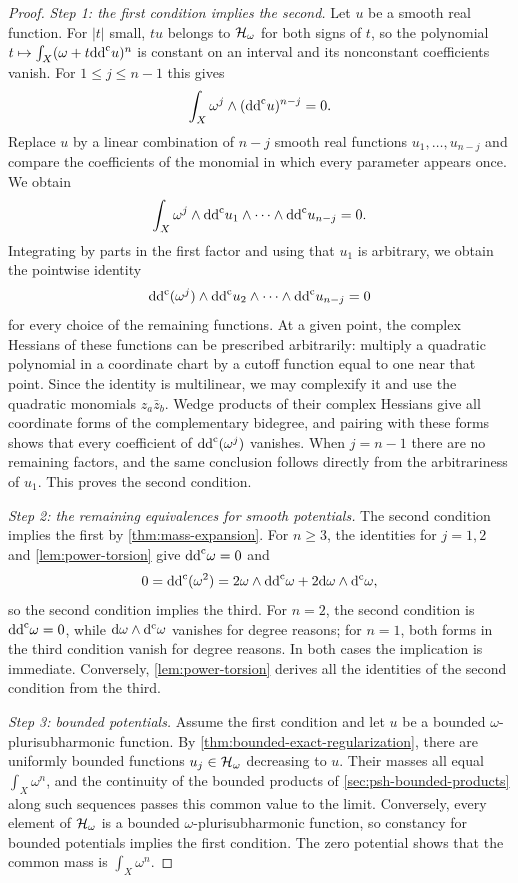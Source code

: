 \begin{proof}
\emph{Step 1: the first condition implies the second.} Let $u$ be a smooth real function. For $|t|$ small, $tu$ belongs to $\mathcal H_\omega$ for both signs of $t$, so the polynomial $t\mapsto\int_X(\omega+t\mathrm{dd}^{\mathrm{c}} u)^n$ is constant on an interval and its nonconstant coefficients vanish. For $1\leq j\leq n-1$ this gives
\[
 \int_X\omega^j\wedge(\mathrm{dd}^{\mathrm{c}} u)^{n-j}=0.
\]
Replace $u$ by a linear combination of $n-j$ smooth real functions $u_1,\ldots,u_{n-j}$ and compare the coefficients of the monomial in which every parameter appears once. We obtain
\[
 \int_X\omega^j\wedge\mathrm{dd}^{\mathrm{c}} u_1\wedge\cdots\wedge\mathrm{dd}^{\mathrm{c}} u_{n-j}=0.
\]
Integrating by parts in the first factor and using that $u_1$ is arbitrary, we obtain the pointwise identity
\[
 \mathrm{dd}^{\mathrm{c}}(\omega^j)\wedge\mathrm{dd}^{\mathrm{c}} u_2\wedge\cdots\wedge\mathrm{dd}^{\mathrm{c}} u_{n-j}=0
\]
for every choice of the remaining functions. At a given point, the complex Hessians of these functions can be prescribed arbitrarily: multiply a quadratic polynomial in a coordinate chart by a cutoff function equal to one near that point. Since the identity is multilinear, we may complexify it and use the quadratic monomials $z_a\bar z_b$. Wedge products of their complex Hessians give all coordinate forms of the complementary bidegree, and pairing with these forms shows that every coefficient of $\mathrm{dd}^{\mathrm{c}}(\omega^j)$ vanishes. When $j=n-1$ there are no remaining factors, and the same conclusion follows directly from the arbitrariness of $u_1$. This proves the second condition.

\emph{Step 2: the remaining equivalences for smooth potentials.} The second condition implies the first by \cref{thm:mass-expansion}. For $n\geq3$, the identities for $j=1,2$ and \cref{lem:power-torsion} give $\mathrm{dd}^{\mathrm{c}}\omega=0$ and
\[
 0=\mathrm{dd}^{\mathrm{c}}(\omega^2)=2\omega\wedge\mathrm{dd}^{\mathrm{c}}\omega
                         +2\mathrm{d}\omega\wedge\mathrm d^{\mathrm c}\omega,
\]
so the second condition implies the third. For $n=2$, the second condition is $\mathrm{dd}^{\mathrm{c}}\omega=0$, while $\mathrm{d}\omega\wedge\mathrm d^{\mathrm c}\omega$ vanishes for degree reasons; for $n=1$, both forms in the third condition vanish for degree reasons. In both cases the implication is immediate. Conversely, \cref{lem:power-torsion} derives all the identities of the second condition from the third.

\emph{Step 3: bounded potentials.} Assume the first condition and let $u$ be a bounded $\omega$-plurisubharmonic function. By \cref{thm:bounded-exact-regularization}, there are uniformly bounded functions $u_j\in\mathcal H_\omega$ decreasing to $u$. Their masses all equal $\int_X\omega^n$, and the continuity of the bounded products of \cref{sec:psh-bounded-products} along such sequences passes this common value to the limit. Conversely, every element of $\mathcal H_\omega$ is a bounded $\omega$-plurisubharmonic function, so constancy for bounded potentials implies the first condition. The zero potential shows that the common mass is $\int_X\omega^n$.
\end{proof}


